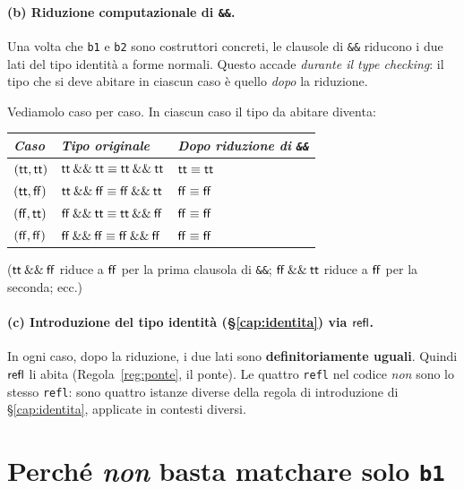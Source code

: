 \paragraph{(b) Riduzione computazionale di \texttt{\&\&}.}
Una volta che \texttt{b1} e \texttt{b2} sono costruttori concreti, le clausole di \texttt{\&\&} riducono i due lati del tipo identit\`a a forme normali. Questo accade \emph{durante il type checking}: il tipo che si deve abitare in ciascun caso \`e quello \emph{dopo} la riduzione.

\medskip

Vediamolo caso per caso. In ciascun caso il tipo da abitare diventa:

\begin{center}
\renewcommand{\arraystretch}{1.2}
\begin{tabular}{lll}
\toprule
\textit{Caso} & \textit{Tipo originale} & \textit{Dopo riduzione di \texttt{\&\&}} \\
\midrule
$(\mathsf{tt},\mathsf{tt})$ & $\mathsf{tt} \mathbin{\&\&} \mathsf{tt} \equiv \mathsf{tt} \mathbin{\&\&} \mathsf{tt}$ & $\mathsf{tt} \equiv \mathsf{tt}$ \\
$(\mathsf{tt},\mathsf{ff})$  & $\mathsf{tt} \mathbin{\&\&} \mathsf{ff} \equiv \mathsf{ff} \mathbin{\&\&} \mathsf{tt}$   & $\mathsf{ff} \equiv \mathsf{ff}$ \\
$(\mathsf{ff},\mathsf{tt})$  & $\mathsf{ff} \mathbin{\&\&} \mathsf{tt} \equiv \mathsf{tt} \mathbin{\&\&} \mathsf{ff}$   & $\mathsf{ff} \equiv \mathsf{ff}$ \\
$(\mathsf{ff},\mathsf{ff})$   & $\mathsf{ff} \mathbin{\&\&} \mathsf{ff} \equiv \mathsf{ff} \mathbin{\&\&} \mathsf{ff}$     & $\mathsf{ff} \equiv \mathsf{ff}$ \\
\bottomrule
\end{tabular}
\end{center}

\smallskip

($\mathsf{tt} \mathbin{\&\&} \mathsf{ff}$ riduce a $\mathsf{ff}$ per la prima clausola di \texttt{\&\&}; $\mathsf{ff} \mathbin{\&\&} \mathsf{tt}$ riduce a $\mathsf{ff}$ per la seconda; ecc.)

\paragraph{(c) Introduzione del tipo identit\`a (\S\ref{cap:identita}) via $\mathsf{refl}$.}
In ogni caso, dopo la riduzione, i due lati sono \textbf{definitoriamente uguali}. Quindi $\mathsf{refl}$ li abita (Regola~\ref{reg:ponte}, il ponte). Le quattro \texttt{refl} nel codice \emph{non} sono lo stesso \texttt{refl}: sono quattro istanze diverse della regola di introduzione di \S\ref{cap:identita}, applicate in contesti diversi.

\section{Perch\'e \emph{non} basta matchare solo \texttt{b1}}


